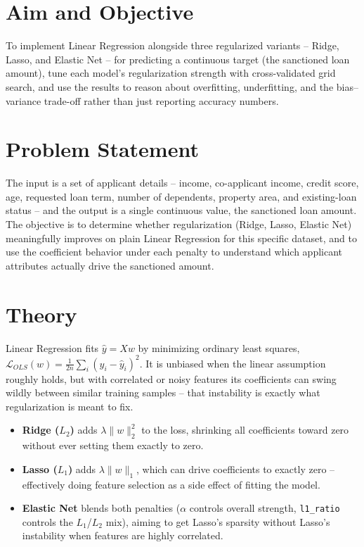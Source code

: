\documentclass[11pt,a4paper]{article}
\begin{document}
\section{Aim and Objective}
To implement Linear Regression alongside three regularized variants -- Ridge, Lasso, and Elastic Net -- for predicting a continuous target (the sanctioned loan amount), tune each model's regularization strength with cross-validated grid search, and use the results to reason about overfitting, underfitting, and the bias--variance trade-off rather than just reporting accuracy numbers.

\section{Problem Statement}
The input is a set of applicant details -- income, co-applicant income, credit score, age, requested loan term, number of dependents, property area, and existing-loan status -- and the output is a single continuous value, the sanctioned loan amount. The objective is to determine whether regularization (Ridge, Lasso, Elastic Net) meaningfully improves on plain Linear Regression for this specific dataset, and to use the coefficient behavior under each penalty to understand which applicant attributes actually drive the sanctioned amount.

\section{Theory}
Linear Regression fits $\hat y = Xw$ by minimizing ordinary least squares, $\mathcal{L}_{OLS}(w) = \tfrac{1}{2n}\sum_i (y_i - \hat y_i)^2$. It is unbiased when the linear assumption roughly holds, but with correlated or noisy features its coefficients can swing wildly between similar training samples -- that instability is exactly what regularization is meant to fix.

\begin{itemize}[nosep]
  \item \textbf{Ridge ($L_2$)} adds $\lambda \lVert w \rVert_2^2$ to the loss, shrinking all coefficients toward zero without ever setting them exactly to zero.
  \item \textbf{Lasso ($L_1$)} adds $\lambda \lVert w \rVert_1$, which can drive coefficients to exactly zero -- effectively doing feature selection as a side effect of fitting the model.
  \item \textbf{Elastic Net} blends both penalties ($\alpha$ controls overall strength, \texttt{l1\_ratio} controls the $L_1$/$L_2$ mix), aiming to get Lasso's sparsity without Lasso's instability when features are highly correlated.
\end{itemize}
\end{document}
